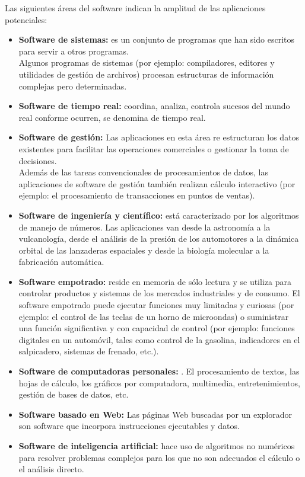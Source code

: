\documentclass[12pt,twoside]{article}
\begin{document}
Las siguientes áreas del software indican la amplitud de las aplicaciones potenciales:
\begin{itemize}
    \item \textbf{ Software de sistemas:} es un conjunto de programas que han sido escritos 
    para servir a otros programas.\\
    Algunos programas de sistemas (por ejemplo: compiladores, editores y utilidades de gestión 
    de archivos) procesan estructuras de información complejas pero determinadas.
    \item \textbf{ Software de tiempo real:}  coordina, analiza, controla sucesos del mundo 
    real conforme ocurren, se denomina de tiempo real.
    \item \textbf{ Software de gestión:} Las aplicaciones en esta área re estructuran los datos 
    existentes para facilitar las operaciones comerciales o gestionar la toma de decisiones. \\
    Además de las tareas convencionales de procesamientos de datos, las aplicaciones de software 
    de gestión también realizan cálculo interactivo (por ejemplo: el procesamiento de transacciones 
    en puntos de ventas).
    \item \textbf{ Software de ingeniería y científico:} está caracterizado por los algoritmos 
    de manejo de números. Las aplicaciones van desde la astronomía a la vulcanología, 
    desde el análisis de la presión de los automotores a la dinámica orbital de las 
    lanzaderas espaciales y desde la biología molecular a la fabricación automática.
    \item \textbf{ Software empotrado:} reside en memoria de sólo lectura y se
    utiliza para controlar productos y sistemas de los mercados industriales y de consumo. El
    software empotrado puede ejecutar funciones muy limitadas y curiosas (por ejemplo: el
    control de las teclas de un horno de microondas) o suministrar una función significativa y
    con capacidad de control (por ejemplo: funciones digitales en un automóvil, tales como
    control de la gasolina, indicadores en el salpicadero, sistemas de frenado, etc.).
    \item \textbf{ Software de computadoras personales:} . El
    procesamiento de textos, las hojas de cálculo, los gráficos por computadora, multimedia,
    entretenimientos, gestión de bases de datos, etc.
    \item \textbf{ Software basado en Web:} Las páginas Web buscadas por un explorador son 
    software que incorpora instrucciones ejecutables y datos.
    \item \textbf{ Software de inteligencia artificial:} hace uso de algoritmos no
    numéricos para resolver problemas complejos para los que no son
    adecuados el cálculo o el análisis directo.
\end{itemize}
\end{document}
